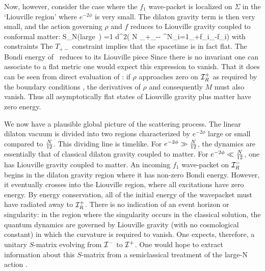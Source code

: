 Now, however, consider the case where the $f_1$ wave-packet is localized
on $\Sigma$ in the `Liouville region' where $e^{-2\phi}$ is very small.
The dilaton gravity term
is then very small, and the action governing $\rho$ and $f$ 
reduces to Liouville gravity coupled
to conformal matter:
%
\eqn\ntyseven
{S_N({\rm large}\ \phi) ={1 \over \pi}\int
 d^2\sigma\left( {N }\partial_+\rho\partial_-\rho - \half
\sum\limits^N_{i=1}\partial_+f_i\partial_-f_i\right)}
%
with constraints
%
\eqn{}
%
The $T_{+-}$ constraint implies that the spacetime is in fact flat.  The
Bondi energy of \ntysix\ reduces to its Liouville piece
%
\eqn{}
%
Since there is no invariant one can associate to a flat
metric one would expect this expression to vanish. That it does can
be seen from direct evaluation of \ntynine:
if $\rho$ approaches zero on ${\cal I}^+_R$ as
required by the boundary conditions \ntyfive, the derivatives of $\rho$ and
consequently $M$ must also vanish. Thus all asymptotically flat states
of Liouville gravity plus matter have zero energy.

We now have a plausible global picture of the scattering process.  The linear
dilaton vacuum is divided into two regions characterized by $e^{-2\phi}$
large or small compared to ${N \over 12}$.  This dividing line is timelike.
For $e^{-2\phi} \gg {N \over 12}$, the dynamics are essentially that of
classical dilaton gravity coupled to matter.
For $e^{-2\phi}\ll {N \over 12}$, one has Liouville
gravity coupled to matter.  An incoming $f_1$ wave-packet on ${\cal I}^-_R$
begins in the dilaton gravity region where it has non-zero Bondi energy.
However, it eventually crosses into the Liouville region, where all
excitations have zero energy. By energy conservation, all of the initial
energy of the wavepacket must have radiated away to ${\cal I}^+_R$.
There is no indication of an event horizon or singularity: in the region where
the singularity occurs in the classical solution, the quantum dynamics are
governed by Liouville gravity (with no cosmological constant) in which
the curvature is required to vanish. One expects,
therefore, a unitary $S$-matrix evolving from ${\cal I}^- $ to
${\cal I}^+ $. One would hope to extract information about this
$S$-matrix from a semiclassical treatment of the
large-N action \ntythree.

